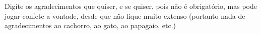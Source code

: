 \begin{agradecimentos}

Digite os agradecimentos que quiser, e se quiser, pois não é obrigatório, mas pode jogar confete a vontade, desde que não fique muito extenso (portanto nada de agradecimentos ao cachorro, ao gato, ao papagaio, etc.)

\end{agradecimentos}
